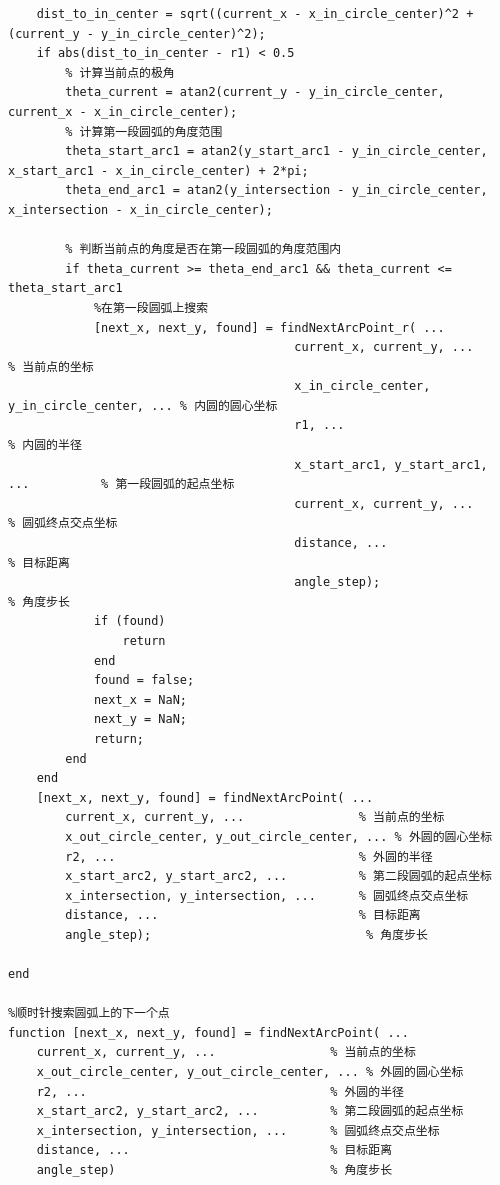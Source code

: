 \documentclass{cumcmthesis1}
\begin{document}
\begin{lstlisting}[caption={求解问题5的代码，将过程和结果打印到控制台上}, label={lst:tenth_code}]
    % 2. 检查当前点是否位于第一段圆弧上
    dist_to_in_center = sqrt((current_x - x_in_circle_center)^2 + (current_y - y_in_circle_center)^2);
    if abs(dist_to_in_center - r1) < 0.5
        % 计算当前点的极角
        theta_current = atan2(current_y - y_in_circle_center, current_x - x_in_circle_center);
        % 计算第一段圆弧的角度范围
        theta_start_arc1 = atan2(y_start_arc1 - y_in_circle_center, x_start_arc1 - x_in_circle_center) + 2*pi;
        theta_end_arc1 = atan2(y_intersection - y_in_circle_center, x_intersection - x_in_circle_center);

        % 判断当前点的角度是否在第一段圆弧的角度范围内
        if theta_current >= theta_end_arc1 && theta_current <= theta_start_arc1
            %在第一段圆弧上搜索
            [next_x, next_y, found] = findNextArcPoint_r( ...
                                        current_x, current_y, ...                % 当前点的坐标
                                        x_in_circle_center, y_in_circle_center, ... % 内圆的圆心坐标
                                        r1, ...                                  % 内圆的半径
                                        x_start_arc1, y_start_arc1, ...          % 第一段圆弧的起点坐标
                                        current_x, current_y, ...      % 圆弧终点交点坐标
                                        distance, ...                            % 目标距离
                                        angle_step);                              % 角度步长
            if (found)
                return
            end
            found = false;
            next_x = NaN;
            next_y = NaN;
            return;
        end
    end
    [next_x, next_y, found] = findNextArcPoint( ...
        current_x, current_y, ...                % 当前点的坐标
        x_out_circle_center, y_out_circle_center, ... % 外圆的圆心坐标
        r2, ...                                  % 外圆的半径
        x_start_arc2, y_start_arc2, ...          % 第二段圆弧的起点坐标
        x_intersection, y_intersection, ...      % 圆弧终点交点坐标
        distance, ...                            % 目标距离
        angle_step);                              % 角度步长

end

%顺时针搜索圆弧上的下一个点
function [next_x, next_y, found] = findNextArcPoint( ...
    current_x, current_y, ...                % 当前点的坐标
    x_out_circle_center, y_out_circle_center, ... % 外圆的圆心坐标
    r2, ...                                  % 外圆的半径
    x_start_arc2, y_start_arc2, ...          % 第二段圆弧的起点坐标
    x_intersection, y_intersection, ...      % 圆弧终点交点坐标
    distance, ...                            % 目标距离
    angle_step)                              % 角度步长


\end{lstlisting}
\end{document}
